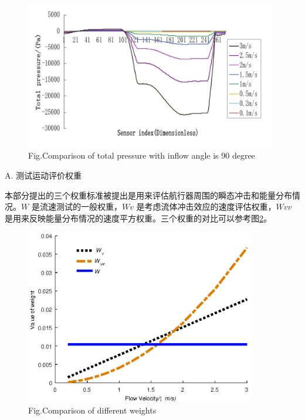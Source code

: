     \begin{figure}[!htp]
        \centering
        \includegraphics[width=11cm]{figure/chap3/fig6c_pressure_90.pdf}
        \label{fig:chap3:F15}
         {Fig.}{Comparison of total pressure with inflow angle is 90 degree}
    \end{figure}


A. {测试运动评价权重}

本部分提出的三个权重标准被提出是用来评估航行器周围的瞬态冲击和能量分布情况。$W$ 是流速测试的一般权重，$Wv$ 是考虑流体冲击效应的速度评估权重，$Wvv$ 是用来反映能量分布情况的速度平方权重。三个权重的对比可以参考图\ref{fig:chap3:F16}。

\begin{figure}[!htp]
    \centering
        \includegraphics[width=10cm]{figure/chap3/fig7_weigiht_EnglishVersion.eps}
        \label{fig:chap3:F16}
         {Fig.}{Comparison of different weights}
\end{figure}

